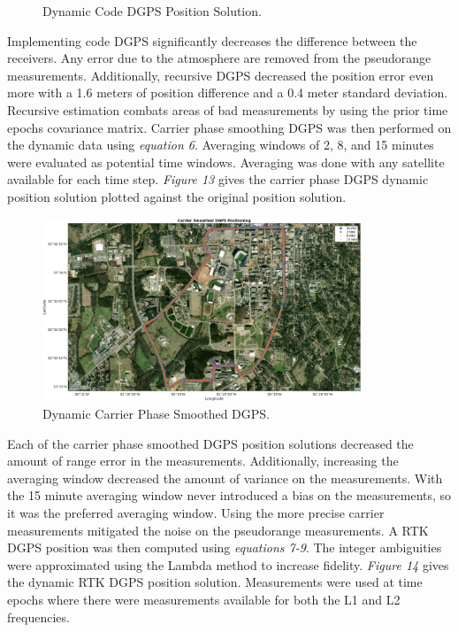 \documentclass[11pt]{article}
\begin{document}
\begin{enumerate}[label=\textbf{\arabic*.}]
\begin{figure}[H]
        \caption{Dynamic Code DGPS Position Solution.}
    \end{figure}
Implementing code DGPS significantly decreases the difference between the receivers. Any error due to the atmosphere are removed from the pseudorange measurements. Additionally, recursive DGPS decreased the position error even more with a 1.6 meters of position difference and a 0.4 meter standard deviation. Recursive estimation combats areas of bad measurements by using the prior time epochs covariance matrix. Carrier phase smoothing DGPS was then performed on the dynamic data using \emph{equation 6}. Averaging windows of 2, 8, and 15 minutes were evaluated as potential time windows. Averaging was done with any satellite available for each time step. \emph{Figure 13} gives the carrier phase DGPS dynamic position solution plotted against the original position solution.
     \begin{figure}[H]
            \centering
            \includegraphics[width=0.85\textwidth]{p3_c.png}
            \caption{Dynamic Carrier Phase Smoothed DGPS.}
        \end{figure}
Each of the carrier phase smoothed DGPS position solutions decreased the amount of range error in the measurements. Additionally, increasing the averaging window decreased the amount of variance on the measurements. With the 15 minute averaging window never introduced a bias on the measurements, so it was the preferred averaging window. Using the more precise carrier measurements mitigated the noise on the pseudorange measurements. A RTK DGPS position was then computed using \emph{equations 7-9}. The integer ambiguities were approximated using the Lambda method to increase fidelity. \emph{Figure 14} gives the dynamic RTK DGPS position solution. Measurements were used at time epochs where there were measurements available for both the L1 and L2 frequencies.
        \begin{figure}[H]

\end{figure}
\end{enumerate}
\end{document}
